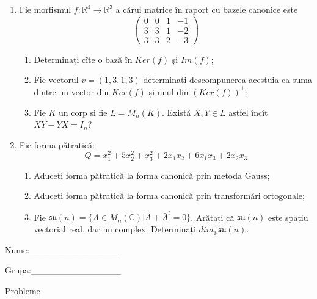 \documentclass{article}
\begin{document}
\begin{enumerate}
 \item Fie morfismul $f:\mathbb{R}^4 \to \mathbb{R}^3$ a cărui matrice în raport cu bazele canonice este
$$\begin{pmatrix}
0&0&1&-1\\
3&3&1&-2\\
3&3&2&-3
\end{pmatrix}$$

\begin{enumerate}
\item Determinați cîte o bază în $Ker(f)$ și $Im(f)$;
\item Fie vectorul $v=(1,3,1,3)$ determinați descompunerea acestuia ca suma dintre un vector din $Ker(f)$ și unul din $(Ker(f))^\perp$;
\item Fie $K$ un corp și fie $L=M_n(K)$. Există $X,Y \in L$ astfel încît $XY-YX=I_n$?  
\end{enumerate}
\item Fie forma pătratică:
$$Q= x_1^2+5x_2^2+x_3^2+2x_1x_2+6x_1x_3+2x_2x_3$$

\begin{enumerate}
\item Aduceți forma pătratică la forma canonică prin metoda Gauss;
\item Aduceți forma pătratică la forma canonică prin transformări ortogonale;
\item Fie $\mathfrak{su}(n)=\{ A \in M_n(\mathbb{C}) | A+\bar{A}^t=0\}$. Arătați că $\mathfrak{su}(n)$ este spațiu vectorial real, dar nu complex.
Determinați $dim_{\mathbb{R}}\mathfrak{su}(n)$.
\end{enumerate}
\end{enumerate}
\newpage
\begin{flushright}
Nume:\_\_\_\_\_\_\_\_\_\_\_\_\_\_
 
 
Grupa:\_\_\_\_\_\_\_\_\_\_\_\_\_\_
\end{flushright}
\begin{center}
\vspace{2cm}
{\Large Probleme}
\vspace{2cm}
\end{center}
\end{document}
